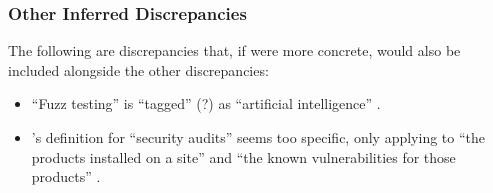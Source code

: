     \subsubsection{Other Inferred Discrepancies}
    The following are discrepancies that, if were more concrete, would also be
    included alongside the other discrepancies:
    \begin{itemize}
        \item ``Fuzz testing'' is ``tagged'' (?) as ``artificial
              intelligence'' \citep[p.~5]{IEEE2022}.
        \item \citeauthor{Gerrard2000b}'s definition for ``security
              audits'' seems too specific, only applying to ``the products
              installed on a site'' and ``the known vulnerabilities for
              those products'' \citeyearpar[p.~28]{Gerrard2000b}.
    \end{itemize}
\fi